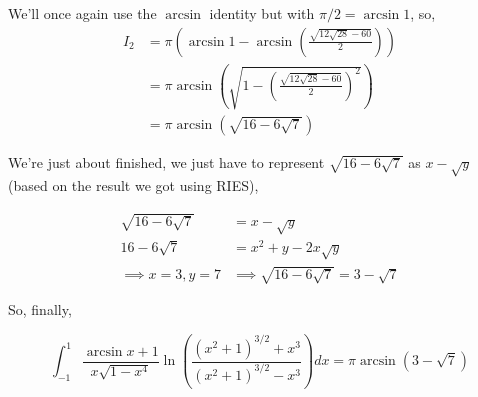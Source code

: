 \documentclass{article}
\begin{document}
We'll once again use the $\arcsin$ identity but with $\pi / 2 = \arcsin{1}$, so, 
\begin{align*}
    I_{2} &= \pi \left( \arcsin{1} -  \arcsin\left( \frac{\sqrt{12\sqrt{28} - 60}}{2} \right) \right) \\ 
    &= \pi\arcsin\left( \sqrt{1 - \left( \frac{\sqrt{12\sqrt{28} - 60}}{2}\right)^2} \right) \\
    &= \pi \arcsin \left( \sqrt{16 - 6\sqrt{7}} \right)
\end{align*}

We're just about finished, we just have to represent $\sqrt{16 - 6\sqrt{7}}$ as $x - \sqrt{y}$ (based on the result we got using RIES),

\begin{align*}
    \sqrt{16 - 6\sqrt{7}} &= x - \sqrt{y} \\
    16 - 6\sqrt{7} &= x^2 + y - 2x\sqrt{y} \\ 
    \implies x = 3, y = 7 &\implies \sqrt{16 - 6\sqrt{7}} = 3 - \sqrt{7}
\end{align*}

So, finally,

$$
\boxed{\int_{-1}^{1}{\frac{\arcsin{x} + 1}{x\sqrt{1-x^4}} \ln\left( \frac{(x^2 + 1)^{3/2} + x^3}{(x^2 + 1)^{3/2} - x^3} \right)dx} = \pi\arcsin\left(3 - \sqrt{7}\right)}
$$
\end{document}

